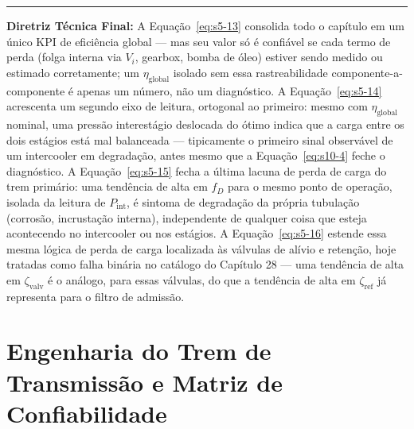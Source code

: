 \documentclass[12pt,a4paper]{article}
\numberwithin{equation}{section}
\numberwithin{table}{section}
\numberwithin{figure}{section}
\begin{document}
{	\vspace{1em}
	\hrule
	\vspace{1em}

	\textbf{Diretriz Técnica Final:} A Equação~\eqref{eq:s5-13} consolida todo o capítulo em um único KPI de eficiência global — mas seu valor só é confiável se cada termo de perda (folga interna via $V_i$, gearbox, bomba de óleo) estiver sendo medido ou estimado corretamente; um $\eta_{\text{global}}$ isolado sem essa rastreabilidade componente-a-componente é apenas um número, não um diagnóstico. A Equação~\eqref{eq:s5-14} acrescenta um segundo eixo de leitura, ortogonal ao primeiro: mesmo com $\eta_{\text{global}}$ nominal, uma pressão interestágio deslocada do ótimo indica que a carga entre os dois estágios está mal balanceada — tipicamente o primeiro sinal observável de um intercooler em degradação, antes mesmo que a Equação~\eqref{eq:s10-4} feche o diagnóstico. A Equação~\eqref{eq:s5-15} fecha a última lacuna de perda de carga do trem primário: uma tendência de alta em $f_D$ para o mesmo ponto de operação, isolada da leitura de $P_{\text{int}}$, é sintoma de degradação da própria tubulação (corrosão, incrustação interna), independente de qualquer coisa que esteja acontecendo no intercooler ou nos estágios. A Equação~\eqref{eq:s5-16} estende essa mesma lógica de perda de carga localizada às válvulas de alívio e retenção, hoje tratadas como falha binária no catálogo do Capítulo 28 — uma tendência de alta em $\zeta_{\text{valv}}$ é o análogo, para essas válvulas, do que a tendência de alta em $\zeta_{\text{ref}}$ já representa para o filtro de admissão.

	
	
	\clearpage
	\section{\textbf{Engenharia do Trem de Transmissão e Matriz de Confiabilidade}}

}
\end{document}
